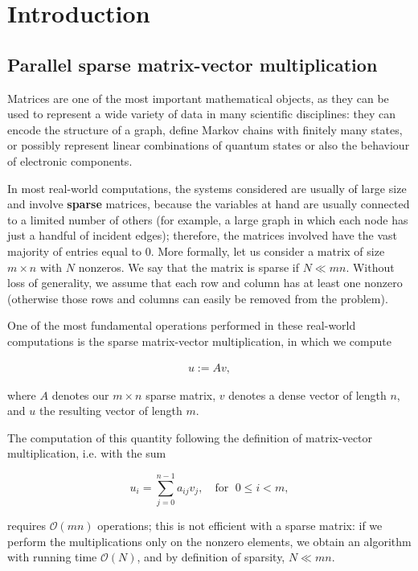 \chapter{Introduction} \label{chap:introduction}
\section{Parallel sparse matrix-vector multiplication} \label{sec:par_matvec}
Matrices are one of the most important mathematical objects, as they can be used to represent a wide variety of data in many scientific disciplines: they can encode the structure of a graph, define Markov chains with finitely many states, or possibly represent linear combinations of quantum states or also the behaviour of electronic components. 

In most real-world computations, the systems considered are usually of large size and involve \textbf{sparse} matrices, because the variables at hand are usually connected to a limited number of others (for example, a large graph in which each node has just a handful of incident edges); therefore, the matrices involved have the vast majority of entries equal to 0. More formally, let us consider a matrix of size $m \times n$ with $N$ nonzeros. We say that the matrix is sparse if $ N \ll mn $. Without loss of generality, we assume that each row and column has at least one nonzero (otherwise those rows and columns can easily be removed from the problem).

One of the most fundamental operations performed in these real-world computations is the sparse matrix-vector multiplication, in which we compute

\begin{align}
	u:=Av,
	\label{uAv}
\end{align}

where $A$ denotes our $m \times n$ sparse matrix, $v$ denotes a dense vector of length $n$, and $u$ the resulting vector of length $m$.

The computation of this quantity following the definition of matrix-vector multiplication, i.e. with the sum 

\[ 
	u_i = \sum_{j=0}^{n-1} a_{ij} v_j, \quad \text{for }\; 0 \leq i < m,
\]

requires $\mathcal{O}(mn)$ operations; this is not efficient with a sparse matrix: if we perform the multiplications only on the nonzero elements, we obtain an algorithm with running time $\mathcal{O}(N)$, and by definition of sparsity, $N \ll mn$.

